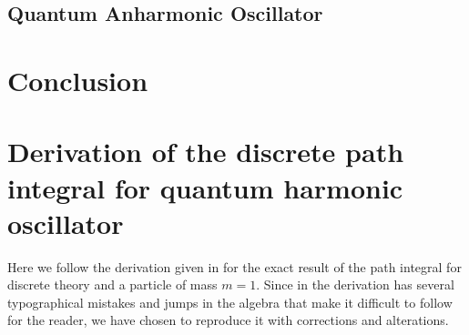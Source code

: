 \documentclass[12pt]{article}
\begin{document}
\subsection{Quantum Anharmonic Oscillator}


\section{Conclusion}






\appendix

\section{Derivation of the discrete path integral for quantum harmonic oscillator}
Here we follow the derivation given in \cite{creutz_freedman_1981} for the exact result of the path integral for discrete theory and a particle of mass $m=1$. Since in \cite{creutz_freedman_1981} the derivation has several typographical mistakes and jumps in the algebra that make it difficult to follow for the reader, we have chosen to reproduce it with corrections and alterations.
\end{document}
